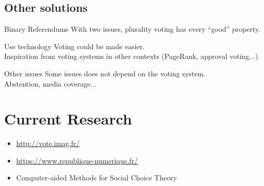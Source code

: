 \documentclass[utf8]{earlywinter}
\begin{document}
\subsection{Other solutions}
\begin{frame}{\subsecname}

  \begin{exampleblock}{Binary Referendums}
    With two issues, plurality voting has every ``good'' property.
  \end{exampleblock}

  \begin{exampleblock}{Use technology}
    Voting could be made easier.\\
    Inspiration from voting systems in other contexts (PageRank, approval voting...).
  \end{exampleblock}

  \begin{alertblock}{Other issues}
    Some issues does not depend on the voting system.\\
    Abstention, media coverage...
  \end{alertblock}

\end{frame}


\section{Current Research}
\begin{frame}{\secname}

  \begin{itemize}
  \item \url{http://vote.imag.fr/}
  \item \url{https://www.republique-numerique.fr/}
  \item Computer-aided Methods for Social Choice Theory
  \end{itemize}
\end{frame}
\end{document}
